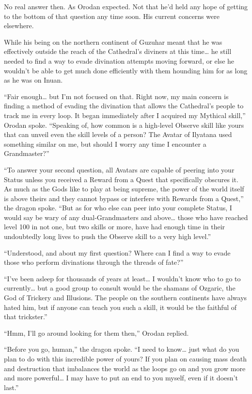 \documentclass[a4paper,10pt]{book}
\begin{document}
No real answer then. As Orodan expected. Not that he’d held any hope of getting to the bottom of that question any time soon. His current concerns were elsewhere.\par
While his being on the northern continent of Guzuhar meant that he was effectively outside the reach of the Cathedral’s diviners at this time… he still needed to find a way to evade divination attempts moving forward, or else he wouldn’t be able to get much done efficiently with them hounding him for as long as he was on Inuan.\par
“Fair enough… but I’m not focused on that. Right now, my main concern is finding a method of evading the divination that allows the Cathedral’s people to track me in every loop. It began immediately after I acquired my Mythical skill,” Orodan spoke. “Speaking of, how common is a high-level Observe skill like yours that can unveil even the skill levels of a person? The Avatar of Ilyatana used something similar on me, but should I worry any time I encounter a Grandmaster?”\par
“To answer your second question, all Avatars are capable of peering into your Status unless you received a Reward from a Quest that specifically obscures it. As much as the Gods like to play at being supreme, the power of the world itself is above theirs and they cannot bypass or interfere with Rewards from a Quest,” the dragon spoke. “But as for who else can peer into your complete Status, I would say be wary of any dual-Grandmasters and above… those who have reached level 100 in not one, but two skills or more, have had enough time in their undoubtedly long lives to push the Observe skill to a very high level.”\par
“Understood, and about my first question? Where can I find a way to evade those who perform divinations through the threads of fate?”\par
“I’ve been asleep for thousands of years at least… I wouldn’t know who to go to currently… but a good group to consult would be the shamans of Ozgaric, the God of Trickery and Illusions. The people on the southern continents have always hated him, but if anyone can teach you such a skill, it would be the faithful of that trickster.”\par
“Hmm, I’ll go around looking for them then,” Orodan replied.\par
“Before you go, human,” the dragon spoke. “I need to know… just what do you plan to do with this incredible power of yours? If you plan on causing mass death and destruction that imbalances the world as the loops go on and you grow more and more powerful… I may have to put an end to you myself, even if it doesn’t last.”\par
\end{document}

